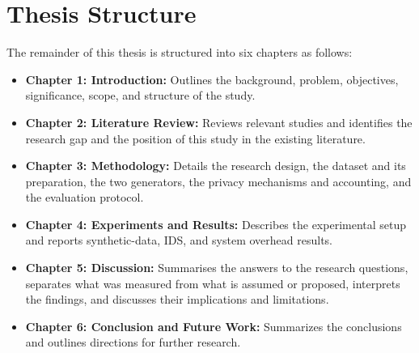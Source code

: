 \section{Thesis Structure}
The remainder of this thesis is structured into six chapters as follows:
\begin{itemize}
    \item \textbf{Chapter 1: Introduction:} Outlines the background, problem, objectives, significance, scope, and structure of the study.
    \item \textbf{Chapter 2: Literature Review:} Reviews relevant studies and identifies the research gap and the position of this study in the existing literature.
    \item \textbf{Chapter 3: Methodology:} Details the research design, the dataset and its preparation, the two generators, the privacy mechanisms and accounting, and the evaluation protocol.
    \item \textbf{Chapter 4: Experiments and Results:} Describes the experimental setup and reports synthetic-data, IDS, and system overhead results.
    \item \textbf{Chapter 5: Discussion:} Summarises the answers to the research questions, separates what was measured from what is assumed or proposed, interprets the findings, and discusses their implications and limitations.
    \item \textbf{Chapter 6: Conclusion and Future Work:} Summarizes the conclusions and outlines directions for further research.
\end{itemize}







